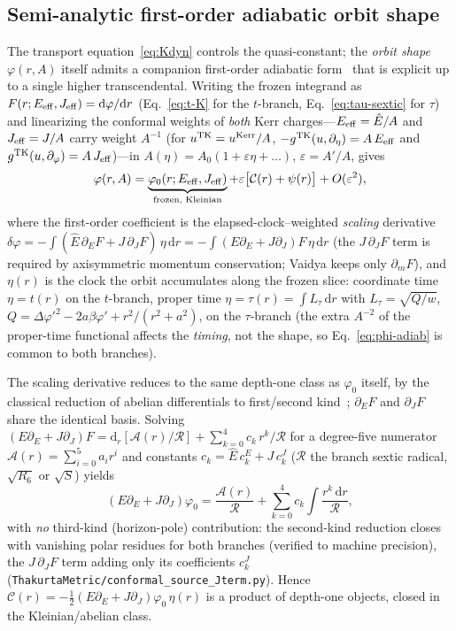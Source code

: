 \documentclass[
    aps, prd, twocolumn, superscriptaddress,
    showpacs, nofootinbib, floatfix
]{revtex4-2}
\newcommand{\Ehat}{\hat E}
\newcommand{\dd}{\mathrm{d}}
\begin{document}
\subsection{Semi-analytic first-order adiabatic orbit shape}
\label{sec:adiabatic}
The transport equation~\eqref{eq:Kdyn} controls the quasi-constant; the
\emph{orbit shape} $\varphi(r,A)$ itself admits a companion first-order adiabatic
form~\cite{BornFock1928,BenderOrszag1999} that is explicit up to a single higher
transcendental. Writing the frozen integrand as
$F(r;E_{\rm eff},J_{\rm eff})=\dd\varphi/\dd r$ (Eq.~\eqref{eq:t-K} for the
$t$-branch, Eq.~\eqref{eq:tau-sextic} for $\tau$) and linearizing the conformal
weights of \emph{both} Kerr charges---$E_{\rm eff}=\Ehat/A$ and $J_{\rm eff}=J/A$
carry weight $A^{-1}$ (for $u^{\rm TK}=u^{\rm Kerr}/A$,
$-g^{\rm TK}(u,\partial_\eta)=A\,E_{\rm eff}$ and
$g^{\rm TK}(u,\partial_\varphi)=A\,J_{\rm eff}$)---in
$A(\eta)=A_0(1+\varepsilon\eta+\dots)$, $\varepsilon=A'/A$, gives
\begin{equation}
    \varphi(r,A)=\underbrace{\varphi_0(r;E_{\rm eff},J_{\rm eff})}_{\text{frozen, Kleinian}}
    +\varepsilon\big[\mathcal{C}(r)+\psi(r)\big]+O(\varepsilon^2),
    \label{eq:phi-adiab}
\end{equation}
where the first-order coefficient is the elapsed-clock--weighted \emph{scaling}
derivative
$\delta\varphi=-\!\int\!(\Ehat\,\partial_E F+J\,\partial_J F)\,\eta\,\dd r
=-\!\int\!(E\partial_E+J\partial_J)F\,\eta\,\dd r$ (the $J\,\partial_J F$ term is
required by axisymmetric momentum conservation; Vaidya keeps only $\partial_m F$),
and $\eta(r)$
is the clock the orbit accumulates along the frozen slice: coordinate time
$\eta=t(r)$ on the $t$-branch, proper time $\eta=\tau(r)=\int\!L_\tau\,\dd r$ with
$L_\tau=\sqrt{Q/w}$, $Q=\Delta\varphi'^2-2a\beta\varphi'+r^2/(r^2+a^2)$, on the
$\tau$-branch (the extra $A^{-2}$ of the proper-time functional affects the
\emph{timing}, not the shape, so Eq.~\eqref{eq:phi-adiab} is common to both
branches).

The scaling derivative reduces to the same depth-one class as $\varphi_0$ itself, by
the classical reduction of abelian differentials to first/second
kind~\cite{BakerAbelian1897,GriffithsHarris1978}; $\partial_E F$ and $\partial_J F$
share the identical basis. Solving $(E\partial_E+J\partial_J)F=\dd_r[\mathcal{A}(r)/\mathcal{R}]
+\sum_{k=0}^{4}c_k\,r^k/\mathcal{R}$ for a degree-five numerator
$\mathcal{A}(r)=\sum_{i=0}^{5}a_ir^i$ and constants $c_k=\Ehat\,c_k^{E}+J\,c_k^{J}$
($\mathcal{R}$ the branch sextic radical, $\sqrt{R_6}$ or
$\sqrt{S}$) yields
\begin{equation}
    (E\partial_E+J\partial_J)\varphi_0=\frac{\mathcal{A}(r)}{\mathcal{R}}
    +\sum_{k=0}^{4}c_k\!\int\!\frac{r^k\,\dd r}{\mathcal{R}},
    \label{eq:dEphi0}
\end{equation}
with \emph{no} third-kind (horizon-pole) contribution: the second-kind reduction
closes with vanishing polar residues for both branches (verified to machine
precision), the $J\,\partial_J F$ term adding only its coefficients $c_k^{J}$
(\texttt{ThakurtaMetric/conformal\_source\_Jterm.py}). Hence
$\mathcal{C}(r)=-\tfrac12(E\partial_E+J\partial_J)\varphi_0\,\eta(r)$ is
a product of depth-one objects, closed in the Kleinian/abelian class.
\end{document}
